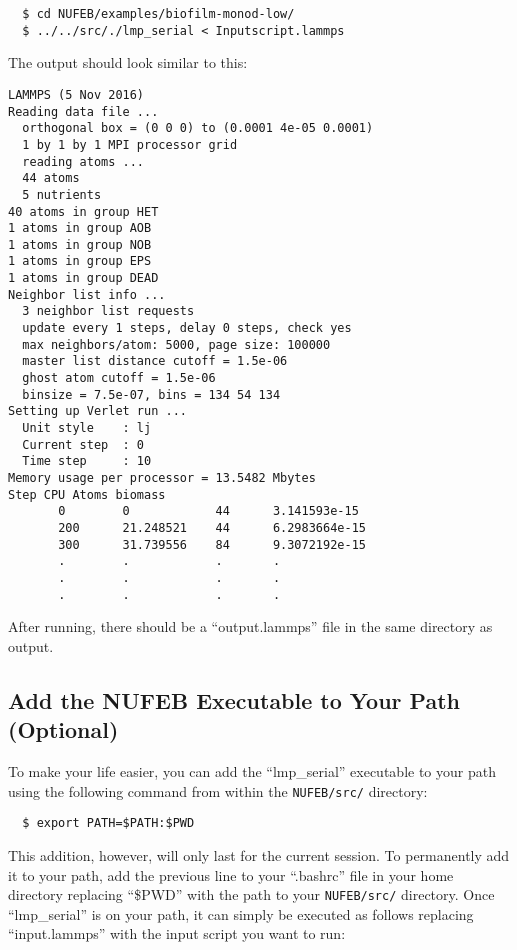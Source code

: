 \documentclass[11pt,a4paper,openright]{article}
\begin{document}
\begin{verbatim}
  $ cd NUFEB/examples/biofilm-monod-low/
  $ ../../src/./lmp_serial < Inputscript.lammps
\end{verbatim}

\noindent
The output should look similar to this:

\begin{verbatim}
LAMMPS (5 Nov 2016)
Reading data file ...
  orthogonal box = (0 0 0) to (0.0001 4e-05 0.0001)
  1 by 1 by 1 MPI processor grid
  reading atoms ...
  44 atoms
  5 nutrients
40 atoms in group HET
1 atoms in group AOB
1 atoms in group NOB
1 atoms in group EPS
1 atoms in group DEAD
Neighbor list info ...
  3 neighbor list requests
  update every 1 steps, delay 0 steps, check yes
  max neighbors/atom: 5000, page size: 100000
  master list distance cutoff = 1.5e-06
  ghost atom cutoff = 1.5e-06
  binsize = 7.5e-07, bins = 134 54 134
Setting up Verlet run ...
  Unit style    : lj
  Current step  : 0
  Time step     : 10
Memory usage per processor = 13.5482 Mbytes
Step CPU Atoms biomass
       0        0            44      3.141593e-15
       200      21.248521    44      6.2983664e-15
       300      31.739556    84      9.3072192e-15
       .        .            .       .    
       .        .            .       .    
       .        .            .       .   

\end{verbatim}

\noindent
After running, there should be a ``output.lammps'' file in the same directory as output.

\subsection{Add the NUFEB Executable to Your Path (Optional)}

\noindent
To make your life easier, you can add the ``lmp\_serial'' executable to your path using the following command from within the {\tt NUFEB/src/} directory:

\begin{verbatim}
  $ export PATH=$PATH:$PWD
\end{verbatim}

\noindent
This addition, however, will only last for the current session.  To permanently add it to your path, add the previous line to your ``.bashrc'' file in your home directory replacing ``\$PWD'' with the path to your {\tt NUFEB/src/} directory.  Once ``lmp\_serial'' is on your path, it can simply be executed as follows replacing ``input.lammps'' with the input script you want to run:
\end{document}

